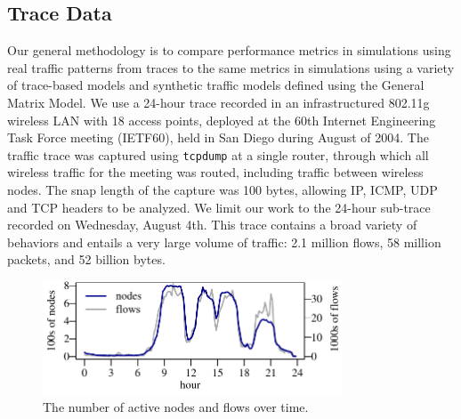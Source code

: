 \documentclass[conference]{IEEEtran}
\newcommand{\caps}[1]{{\small{#1}}}
\begin{document}
\subsection{Trace Data}\label{sec:trace-data}

Our general methodology is to compare performance metrics in simulations using real traffic patterns from traces to the same metrics in simulations using a variety of trace-based models and synthetic traffic models defined using the General Matrix Model. We use a 24-hour trace recorded in an infrastructured 802.11g wireless \caps{LAN} with 18 access points, deployed at the 60th Internet Engineering Task Force meeting (\caps{IETF}60), held in San Diego during August of 2004. The traffic trace was captured using \texttt{\small{tcpdump}} at a single router, through which all wireless traffic for the meeting was routed, including traffic between wireless nodes. The snap length of the capture was 100 bytes, allowing \caps{IP}, \caps{ICMP}, \caps{UDP} and \caps{TCP} headers to be analyzed. We limit our work to the 24-hour sub-trace recorded on Wednesday, August 4th. This trace contains a broad variety of behaviors and entails a very large volume of traffic: 2.1 million flows, 58 million packets, and 52 billion bytes.

\begin{figure}
\vspace{0.45em}
\begin{center}
\includegraphics[width=3.5in]{nodes-flows}%
\vspace{-0.75em}%
\caption{The number of active nodes and flows over time.} 
\label{fig:nodes-flows}
\end{center}
\vspace{-2em}
\end{figure}
\end{document}
